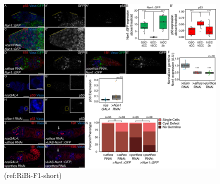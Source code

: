 \documentclass[12pt,oneside]{reedthesis}
\begin{document}
\begin{figure}

{\centering \includegraphics[width=7 in,height=5.409091 in]{./figure/Ribosome Biogenesis/Ribosome Biogenesis 5S} 

}

\caption[(ref:RiBi-F1-short)]{(ref:RiBi-F1-short)}\label{fig:unnamed-chunk-15}
\end{figure}
\end{document}
